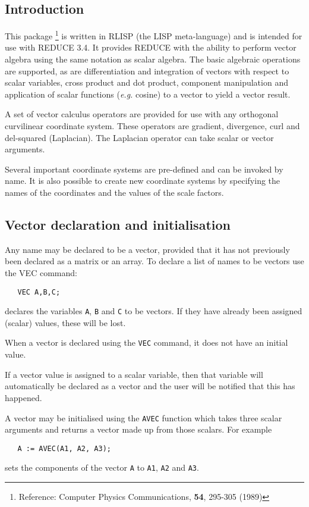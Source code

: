 

\subsection{Introduction}

This package \footnote{Reference: Computer Physics Communications,
{\bf 54}, 295-305 (1989)}
is written in RLISP (the LISP meta-language) and is
intended for use with REDUCE 3.4.  It provides
REDUCE with the ability to perform vector algebra using the same
notation as scalar algebra.  The basic algebraic operations are
supported, as are differentiation and integration of vectors with
respect to scalar variables, cross product and dot product, component
manipulation and application of scalar functions ({\em e.g.} cosine)
to a vector to yield a vector result.

A set of vector calculus operators are provided for use with any
orthogonal curvilinear coordinate system. These operators are
gradient, divergence, curl and del-squared (Laplacian).  The Laplacian
operator can take scalar or vector arguments.

Several important coordinate systems are pre-defined and can be
invoked by name. It is also possible to create new coordinate systems
by specifying the names of the coordinates and the values of the scale
factors.

\subsection{Vector declaration and initialisation}

Any name may be declared to be a vector, provided that it has
not previously been declared as a matrix or an array. To
declare a list of names to be vectors use the VEC command:
\begin{verbatim}
   VEC A,B,C;
\end{verbatim}
declares the variables {\tt A}, {\tt B} and {\tt C} to be vectors.
If they have already been assigned (scalar) values, these will be lost.

When a vector is declared using the {\tt VEC} command, it does not
have an initial value.

If a vector value is assigned to a scalar variable, then that
variable will automatically be declared as a vector and the
user will be notified that this has happened.

A vector may be initialised using the {\tt AVEC} function which
takes three scalar arguments and returns a vector made up
from those scalars. For example
\begin{verbatim}
   A := AVEC(A1, A2, A3);
\end{verbatim}
sets the components of the vector {\tt A} to {\tt A1}, {\tt A2} and {\tt A3}.

